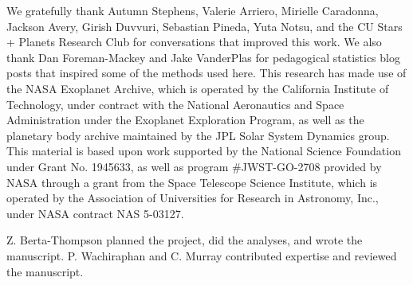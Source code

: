 \documentclass[modern,linenumbers,trackchanges]{aastex7}
\begin{document}
\begin{acknowledgments}
We gratefully thank Autumn Stephens, Valerie Arriero, Mirielle Caradonna, Jackson Avery, Girish Duvvuri, Sebastian Pineda, Yuta Notsu, and the CU Stars + Planets Research Club for conversations that improved this work. We also thank Dan Foreman-Mackey and Jake VanderPlas for pedagogical statistics blog posts that inspired some of the methods used here. This research has made use of the NASA Exoplanet Archive, which is operated by the California Institute of Technology, under contract with the National Aeronautics and Space Administration under the Exoplanet Exploration Program, as well as the planetary body archive maintained by the JPL Solar System Dynamics group. This material is based upon work supported by the National Science Foundation under Grant No. 1945633, as well as  program \#JWST-GO-2708 provided by NASA through a grant from the Space Telescope Science Institute, which is operated by the Association of Universities for Research in Astronomy, Inc., under NASA contract NAS 5-03127. 
\end{acknowledgments}

\begin{contribution}
Z. Berta-Thompson planned the project, did the analyses, and wrote the manuscript. P. Wachiraphan and C. Murray contributed expertise and reviewed the manuscript.

\end{contribution}





{}

\end{document}
